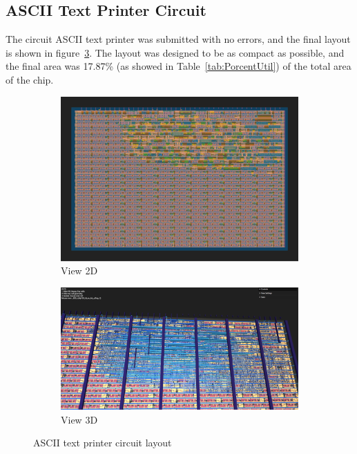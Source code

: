 \subsection{ASCII Text Printer Circuit}

The circuit ASCII text printer was submitted with no errors, and the final layout is shown in figure\ \ref{fig:ASCII_Layout}. The layout was designed to be as compact as possible, and the final area was 17.87\% (as showed in Table\ \ref*{tab:PorcentUtil}) of the total area of the chip.

\begin{figure}[H]
    \centering
    \begin{subfigure}[b]{0.45\textwidth}
        \includegraphics[width=\linewidth]{Pictures/Result_ASCII_2D_View.png}
        \caption{View 2D}\label{fig:ASCII_2D}
    \end{subfigure}
    \begin{subfigure}[b]{0.45\textwidth}
        \includegraphics[width=\linewidth]{Pictures/Result_ASCII_3D_View.png}
        \caption{View 3D}\label{fig:ASCII_3D}
    \end{subfigure}
    \caption{ASCII text printer circuit layout}\label{fig:ASCII_Layout}
\end{figure}

